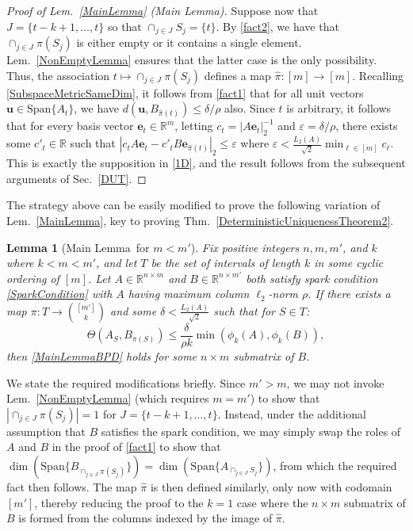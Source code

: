\documentclass[journal, twocolumn]{IEEEtran}
\newtheorem{lemma}{Lemma}
\begin{document}
\begin{proof}[Proof of Lem.~\ref{MainLemma} (Main Lemma)]
Suppose now that $J = \{t-k+1, \ldots, t\}$ so that \mbox{$\cap_{j \in J} S_j = \{t\}$}. By \eqref{fact2}, we have that $\cap_{j \in J} \pi(S_j)$ is either empty or it contains a single element. Lem.~\ref{NonEmptyLemma} ensures that the latter case is the only possibility. Thus, the association $t \mapsto \cap_{j \in J} \pi(S_j)$ defines a map $\hat \pi: [m] \to [m]$. Recalling \eqref{SubspaceMetricSameDim}, it follows from \eqref{fact1} that for all unit vectors $\mathbf{u} \in \text{Span}\{A_t\}$, we have $d\left( \mathbf{u}, B_{\hat \pi(t)}\right) \leq \delta/\rho$ also. Since $t$ is arbitrary, it follows that for every basis vector $\mathbf{e}_t \in \mathbb{R}^m$, letting $c_t = |A\mathbf{e}_t|_2^{-1}$ and $\varepsilon = \delta/\rho$, there exists some $c'_t \in \mathbb{R}$ such that $|c_tA\mathbf{e}_t - c'_tB\mathbf{e}_{\hat \pi(t)}|_2 \leq \varepsilon$ where $\varepsilon < \frac{L_2(A)}{\sqrt{2}} \min_{\ell \in [m]} c_{\ell}$. This is exactly the supposition in \eqref{1D}, and the result follows from the subsequent arguments of Sec.~\ref{DUT}.
\end{proof}

The strategy above can be easily modified to prove the following variation of Lem.~\ref{MainLemma}, key to proving Thm.~\ref{DeterministicUniquenessTheorem2}.

\begin{lemma}[Main Lemma~for $m < m'$]\label{MainLemma2}
Fix positive integers $n, m, m'$, and $k$ where $k < m < m'$, and let $T$ be the set of intervals of length $k$ in some cyclic ordering of $[m]$. Let $A \in \mathbb{R}^{n \times m}$ and $B \in \mathbb{R}^{n \times m'}$ both satisfy spark condition \eqref{SparkCondition} with $A$ having maximum column $\ell_2$-norm $\rho$. If there exists a map $\pi: T \to {[m'] \choose k}$ and some $\delta < \frac{L_{2}(A)}{\sqrt{2}}$ such that for $S \in T$:
\begin{equation}\label{GapUpperBound2}
\Theta(A_{S}, B_{\pi(S)}) \leq \frac{ \delta }{\rho k} \min(\phi_k(A), \phi_k(B)),
\end{equation}
then \eqref{MainLemmaBPD} holds for some $n \times m$ submatrix of $B$. 
\end{lemma}

We state the required modifications briefly. Since $m' > m$, we may not invoke Lem.~\ref{NonEmptyLemma} (which requires $m = m'$) to show that $|\cap_{j \in J} \pi(S_j)| = 1$ for $J = \{t-k+1, \ldots, t\}$. Instead, under the additional assumption that $B$ satisfies the spark condition, we may simply swap the roles of $A$ and $B$ in the proof of \eqref{fact1} to show that $\dim(\text{Span}\{B_{\cap_{j \in J}\pi(S_j)}\}) = \dim(\text{Span}\{A_{\cap_{j \in J} S_j}\})$, from which the required fact then follows. The map $\hat \pi$ is then defined similarly, only now with codomain $[m']$, thereby reducing the proof to the $k=1$ case where the $n \times m$ submatrix of $B$ is formed from the columns indexed by the image of $\hat \pi$. 
\end{document}
